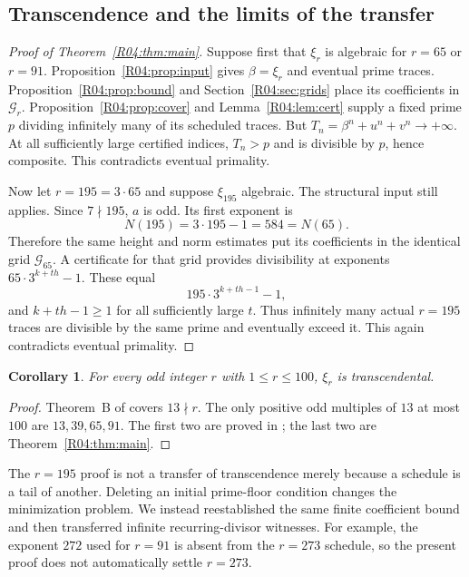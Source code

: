 \documentclass[11pt,a4paper]{article}
\newtheorem{corollary}[theorem]{Corollary}\newtheorem{mainthm}[theorem]{Theorem}
\theoremstyle{definition}\newtheorem{definition}[theorem]{Definition}
\theoremstyle{remark}\newtheorem{remark}[theorem]{Remark}
\begin{document}
\subsection{Transcendence and the limits of the transfer}
\label{R04:sec:conclusion}

\begin{proof}[Proof of Theorem~\ref{R04:thm:main}]
Suppose first that $\xi_r$ is algebraic for $r=65$ or $r=91$.
Proposition~\ref{R04:prop:input} gives $\beta=\xi_r$ and eventual prime
traces. Proposition~\ref{R04:prop:bound} and Section~\ref{R04:sec:grids}
place its coefficients in $\mathcal G_r$.
Proposition~\ref{R04:prop:cover} and Lemma~\ref{R04:lem:cert} supply a fixed
prime $p$ dividing infinitely many of its scheduled traces.
But $T_n=\beta^n+u^n+v^n\longrightarrow+\infty$.
At all sufficiently large certified indices, $T_n>p$ and is divisible
by $p$, hence composite. This contradicts eventual primality.

Now let $r=195=3\cdot65$ and suppose $\xi_{195}$ algebraic.
The structural input still applies. Since $7\nmid195$, $a$ is odd.
Its first exponent is
\[
 N(195)=3\cdot195-1=584=N(65).
\]
Therefore the same height and norm estimates put its coefficients
in the identical grid $\mathcal G_{65}$. A certificate for that grid
provides divisibility at exponents $65\cdot3^{k+th}-1$. These equal
\[
 195\cdot3^{k+th-1}-1,
\]
and $k+th-1\ge1$ for all sufficiently large $t$.
Thus infinitely many actual $r=195$ traces are divisible by the same
prime and eventually exceed it. This again contradicts eventual
primality.
\end{proof}

\begin{corollary}\label{R04:cor:100}
For every odd integer $r$ with $1\le r\le100$, $\xi_r$ is transcendental.
\end{corollary}
\begin{proof}
Theorem~B of \cite{K064} covers $13\nmid r$.
The only positive odd multiples of $13$ at most $100$ are
$13,39,65,91$. The first two are proved in \cite{R02}; the last two
are Theorem~\ref{R04:thm:main}.
\end{proof}

The $r=195$ proof is not a transfer of transcendence merely because a
schedule is a tail of another. Deleting an initial prime-floor
condition changes the minimization problem. We instead reestablished
the same finite coefficient bound and then transferred infinite
recurring-divisor witnesses. For example, the exponent $272$ used
for $r=91$ is absent from the $r=273$ schedule, so the present proof
does not automatically settle $r=273$.
\end{document}
